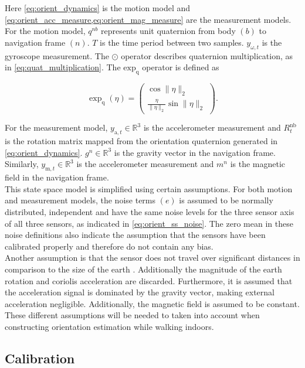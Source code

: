 Here \cref{eq:orient_dynamics} is the motion model and \cref{eq:orient_acc_measure,eq:orient_mag_measure} are the measurement models. \\
For the motion model, $q^{nb}$ represents unit quaternion from body $(b)$ to navigation frame $(n)$. $T$ is the time period between two samples. $y_{\omega, t}$ is the gyroscope measurement. The $\odot$ operator describes quaternion multiplication, as in \cref{eq:quat_multiplication}. The $\text{exp}_\text{q}$ operator is defined as

\begin{equation}
	\exp_\mathrm{q} (\eta) = \left(\begin{array}{c}{\cos \|\eta\|_{2}} \\ {\frac{\eta}{\|\eta\|_{2}} \sin \|\eta\|_{2}}\end{array}\right) \label{eq:exp_q_in_text}.
\end{equation}

For the measurement model, $y_{\mathrm{a}, t}\in \mathbb{R}^3$ is the accelerometer measurement and $R^\mathrm{nb}_t$ is the rotation matrix mapped from the orientation quaternion generated in \eqref{eq:orient_dynamics}. $g^n \in \mathbb{R}^3$ is the gravity vector in the navigation frame. Similarly, $y_{\mathrm{m}, t}\in \mathbb{R}^3$ is the accelerometer measurement and $m^n$ is the magnetic field in the navigation frame. \\
This state space model is simplified using certain assumptions.
For both motion and measurement models, the noise terms  $(e)$ is assumed to be normally distributed, independent and have the same noise levels for the three sensor axis of all three sensors, as indicated in \cref{eq:orient_ss_noise}. The zero mean in these noise definitions also indicate the assumption that the sensors have been calibrated properly and therefore do not contain any bias. \\
Another assumption is that the sensor does not travel over significant distances in comparison to the size of the earth \cite{Kok2017}. Additionally the magnitude of the earth rotation and coriolis acceleration are discarded. Furthermore, it is assumed that the acceleration signal is dominated by the gravity vector, making external acceleration negligible. Additionally, the magnetic field is assumed to be constant. These different assumptions will be needed to taken into account when constructing orientation estimation while walking indoors.

\subsection{Calibration}

